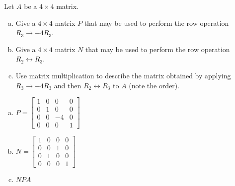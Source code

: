 
\begin{exerciseStatement}


Let \(A\) be a \(4 \times 4\) matrix.


\begin{enumerate}[(a)]
\item Give a \(4 \times 4\) matrix \(P\) that may be used to perform the row operation \( R_3 \to -4R_3 \).
\item Give a \(4 \times 4\) matrix \(N\) that may be used to perform the row operation \( R_2 \leftrightarrow R_3 \).
\item Use matrix multiplication to describe the matrix obtained by applying \( R_3 \to -4R_3 \) and then \( R_2 \leftrightarrow R_3 \) to \(A\) (note the order). 
\end{enumerate}
    
\end{exerciseStatement}
    
\begin{exerciseAnswer} 

\begin{enumerate}[(a)]
\item \(P= \left[\begin{array}{cccc}
1 & 0 & 0 & 0 \\
0 & 1 & 0 & 0 \\
0 & 0 & -4 & 0 \\
0 & 0 & 0 & 1
\end{array}\right] \)
\item \(N= \left[\begin{array}{cccc}
1 & 0 & 0 & 0 \\
0 & 0 & 1 & 0 \\
0 & 1 & 0 & 0 \\
0 & 0 & 0 & 1
\end{array}\right] \)
\item \(NPA\)
\end{enumerate}
    
\end{exerciseAnswer}
    

